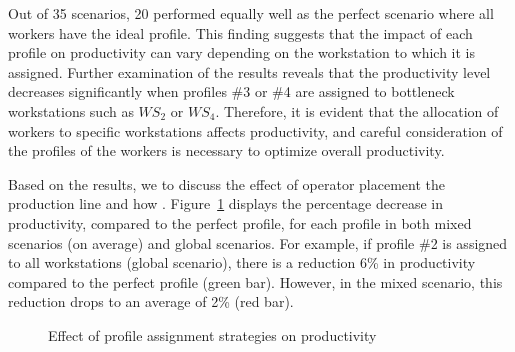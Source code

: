 \documentclass[review,12pt, 3p, times]{elsarticle}
\begin{document}
Out of 35 scenarios, 20 performed equally well as the perfect scenario where all workers have the ideal profile. This finding suggests that the impact of each profile on productivity can vary depending on the workstation to which it is assigned. Further examination of the results reveals that the productivity level decreases significantly when profiles \#3 or \#4 are assigned to bottleneck workstations such as $\textit{WS}_2$ or $\textit{WS}_4$. Therefore, it is evident that the allocation of workers to specific workstations affects productivity, and careful consideration of the profiles of the workers is necessary to optimize overall productivity.
	
Based on the results, we  to discuss the effect of operator placement  the production line and how .
Figure~\ref{fig:glo_mix} displays the percentage decrease in productivity, compared to the perfect profile, 
for each profile in both mixed scenarios (on average) and global scenarios. For example, if profile \#2 is assigned to all workstations (global scenario), there is a reduction  6\% in productivity compared to the perfect profile (green bar). However, in the mixed scenario, this reduction drops to an average of 2\% (red bar).

\begin{figure}[htbp]
    \centering								
    \caption{Effect of profile assignment strategies on productivity}
    \label{fig:glo_mix}
\end{figure}
\end{document}
